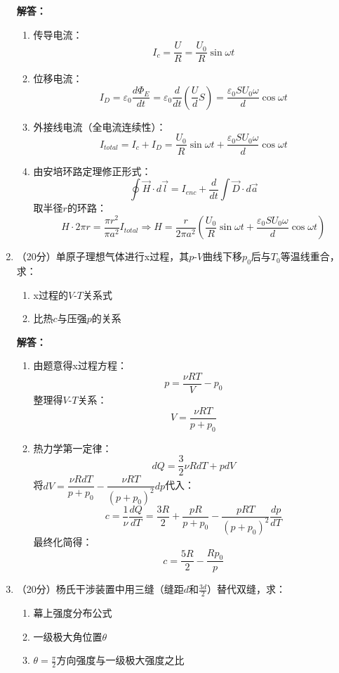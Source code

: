 \documentclass{article}
\begin{document}
\begin{enumerate}[label=\arabic*.]
    \textbf{解答：}
    \begin{enumerate}
        \item 传导电流：
        $$
        I_c = \dfrac{U}{R} = \dfrac{U_0}{R}\sin\omega t
        $$
        \item 位移电流：
        $$
        I_D = \varepsilon_0 \dfrac{d\Phi_E}{dt} = \varepsilon_0 \dfrac{d}{dt}\left( \dfrac{U}{d}S \right) = \dfrac{\varepsilon_0 S U_0 \omega}{d}\cos\omega t
        $$
        \item 外接线电流（全电流连续性）：
        $$
        I_{total} = I_c + I_D = \dfrac{U_0}{R}\sin\omega t + \dfrac{\varepsilon_0 S U_0 \omega}{d}\cos\omega t
        $$
        \item 由安培环路定理修正形式：
        $$
        \oint \vec{H} \cdot d\vec{l} = I_{enc} + \dfrac{d}{dt}\int \vec{D} \cdot d\vec{a}
        $$
        取半径$r$的环路：
        $$
        H \cdot 2\pi r = \dfrac{\pi r^2}{\pi a^2}I_{total} \Rightarrow H = \dfrac{r}{2\pi a^2}\left( \dfrac{U_0}{R}\sin\omega t + \dfrac{\varepsilon_0 S U_0 \omega}{d}\cos\omega t \right)
        $$
    \end{enumerate}

    \item （20分）单原子理想气体进行x过程，其$p\text{-}V$曲线下移$p_0$后与$T_0$等温线重合，求：
    \begin{enumerate}
        \item x过程的$V\text{-}T$关系式
        \item 比热$c$与压强$p$的关系
    \end{enumerate}
    
    \textbf{解答：}
    \begin{enumerate}
        \item 由题意得x过程方程：
        $$
        p = \dfrac{\nu R T}{V} - p_0
        $$
        整理得$V\text{-}T$关系：
        $$
        V = \dfrac{\nu R T}{p + p_0}
        $$
        \item 热力学第一定律：
        $$
        dQ = \dfrac{3}{2}\nu R dT + p dV
        $$
        将$dV = \dfrac{\nu R dT}{p + p_0} - \dfrac{\nu R T}{(p + p_0)^2}dp$代入：
        $$
        c = \dfrac{1}{\nu}\dfrac{dQ}{dT} = \dfrac{3R}{2} + \dfrac{p R}{p + p_0} - \dfrac{p R T}{(p + p_0)^2}\dfrac{dp}{dT}
        $$
        最终化简得：
        $$
        c = \dfrac{5R}{2} - \dfrac{R p_0}{p}
        $$
    \end{enumerate}

    \item （20分）杨氏干涉装置中用三缝（缝距$d$和$\frac{3d}{2}$）替代双缝，求：
    \begin{enumerate}
        \item 幕上强度分布公式
        \item 一级极大角位置$\theta$
        \item $\theta=\frac{\pi}{2}$方向强度与一级极大强度之比
    \end{enumerate}
    

\end{enumerate}
\end{document}
